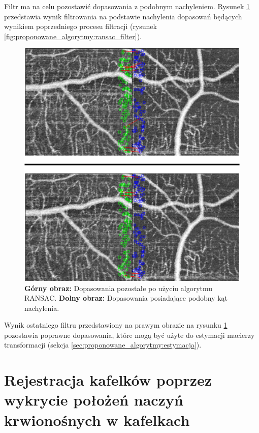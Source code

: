 Filtr ma na celu pozostawić dopasowania z podobnym nachyleniem. Rysunek \ref{fig:proponowane_algorytmy:slope} przedstawia wynik filtrowania na podstawie nachylenia dopasowań będących wynikiem poprzedniego procesu filtracji (rysunek \ref{fig:proponowane_algorytmy:ransac_filter}).

\begin{figure}[htb]
  \centering
  \includegraphics[width=\textwidth]{gfx/slope}
  \caption{\textbf{Górny obraz:} Dopasowania pozostałe po użyciu algorytmu RANSAC. \textbf{Dolny obraz:} Dopasowania posiadające podobny kąt nachylenia.}
  \label{fig:proponowane_algorytmy:slope}
\end{figure}

Wynik ostatniego filtru przedstawiony na prawym obrazie na rysunku \ref{fig:proponowane_algorytmy:slope} pozostawia poprawne dopasowania, które mogą być użyte do estymacji macierzy transformacji (sekcja \ref{sec:proponowane_algorytmy:estymacja}).

\section{Rejestracja kafelków poprzez wykrycie położeń naczyń krwionośnych w kafelkach}
\label{sec:proponowane_algorytmy:depth_first_search}

